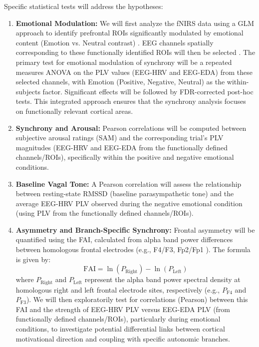 \documentclass[12pt]{article} %
\begin{document}
Specific statistical tests will address the hypotheses:
\begin{enumerate}[label=(\alph*)]
    \item \textbf{Emotional Modulation:} We will first analyze the \gls{fNIRS} data using a \gls{GLM} approach to identify prefrontal \gls{ROI}s significantly modulated by emotional content (Emotion vs. Neutral contrast) \parencite{yucelBestPracticesFNIRS2021}. \gls{EEG} channels spatially corresponding to these functionally identified ROIs will then be selected \parencite{gramfortMEGEEGData2013}. The primary test for emotional modulation of synchrony will be a repeated measures \gls{ANOVA} on the \gls{PLV} values (\gls{EEG}-\gls{HRV} and \gls{EEG}-\gls{EDA}) from these selected channels, with Emotion (Positive, Negative, Neutral) as the within-subjects factor. Significant effects will be followed by FDR-corrected post-hoc tests. This integrated approach ensures that the synchrony analysis focuses on functionally relevant cortical areas.
    \item \textbf{Synchrony and Arousal:} Pearson correlations will be computed between subjective arousal ratings (\gls{SAM}) and the corresponding trial's \gls{PLV} magnitudes (\gls{EEG}-\gls{HRV} and \gls{EEG}-\gls{EDA} from the functionally defined channels/ROIs), specifically within the positive and negative emotional conditions.
    \item \textbf{Baseline Vagal Tone:} A Pearson correlation will assess the relationship between resting-state \gls{RMSSD} (baseline parasympathetic tone) and the average \gls{EEG}-\gls{HRV} \gls{PLV} observed during the negative emotional condition (using PLV from the functionally defined channels/ROIs).
    \item \textbf{Asymmetry and Branch-Specific Synchrony:} Frontal asymmetry will be quantified using the \gls{FAI}, calculated from alpha band power differences between homologous frontal electrodes (e.g., F4/F3, Fp2/Fp1 \parencite{rodriguesMethodsMatterExamination2021, allenIssuesAssumptionsRoad2004}). The formula is given by:
    \begin{equation}
        \text{FAI} = \ln(P_{\text{Right}}) - \ln(P_{\text{Left}})
        \label{eq:fai} %
    \end{equation}
    where $P_{\text{Right}}$ and $P_{\text{Left}}$ represent the alpha band power spectral density at homologous right and left frontal electrode sites, respectively (e.g., $P_{\text{F4}}$ and $P_{\text{F3}}$). We will then exploratorily test for correlations (Pearson) between this \gls{FAI} and the strength of \gls{EEG}-\gls{HRV} \gls{PLV} versus \gls{EEG}-\gls{EDA} \gls{PLV} (from functionally defined channels/ROIs), particularly during emotional conditions, to investigate potential differential links between cortical motivational direction and coupling with specific autonomic branches.
\end{enumerate}
\end{document}
